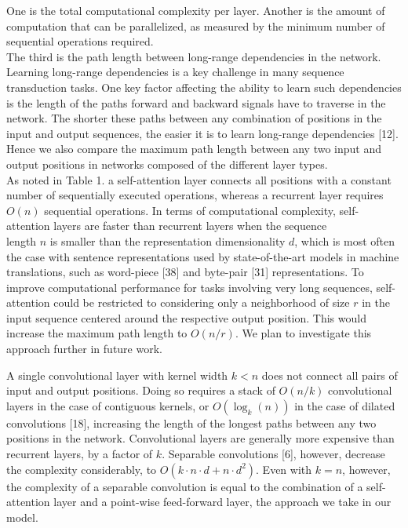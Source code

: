 \documentclass[10pt]{article}
\begin{document}
One is the total computational complexity per layer. Another is the amount of computation that can be parallelized, as measured by the minimum number of sequential operations required.\\[0pt]
The third is the path length between long-range dependencies in the network. Learning long-range dependencies is a key challenge in many sequence transduction tasks. One key factor affecting the ability to learn such dependencies is the length of the paths forward and backward signals have to traverse in the network. The shorter these paths between any combination of positions in the input and output sequences, the easier it is to learn long-range dependencies [12]. Hence we also compare the maximum path length between any two input and output positions in networks composed of the different layer types.\\
As noted in Table 1. a self-attention layer connects all positions with a constant number of sequentially executed operations, whereas a recurrent layer requires $O(n)$ sequential operations. In terms of computational complexity, self-attention layers are faster than recurrent layers when the sequence\\
length $n$ is smaller than the representation dimensionality $d$, which is most often the case with sentence representations used by state-of-the-art models in machine translations, such as word-piece [38] and byte-pair [31] representations. To improve computational performance for tasks involving very long sequences, self-attention could be restricted to considering only a neighborhood of size $r$ in the input sequence centered around the respective output position. This would increase the maximum path length to $O(n / r)$. We plan to investigate this approach further in future work.

A single convolutional layer with kernel width $k<n$ does not connect all pairs of input and output positions. Doing so requires a stack of $O(n / k)$ convolutional layers in the case of contiguous kernels, or $O\left(\log _{k}(n)\right)$ in the case of dilated convolutions [18], increasing the length of the longest paths between any two positions in the network. Convolutional layers are generally more expensive than recurrent layers, by a factor of $k$. Separable convolutions [6], however, decrease the complexity considerably, to $O\left(k \cdot n \cdot d+n \cdot d^{2}\right)$. Even with $k=n$, however, the complexity of a separable convolution is equal to the combination of a self-attention layer and a point-wise feed-forward layer, the approach we take in our model.
\end{document}
